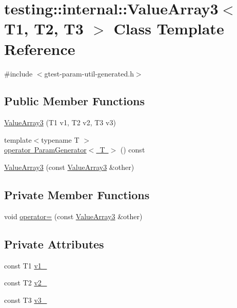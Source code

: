 \hypertarget{classtesting_1_1internal_1_1_value_array3}{}\section{testing\+::internal\+::Value\+Array3$<$ T1, T2, T3 $>$ Class Template Reference}
\label{classtesting_1_1internal_1_1_value_array3}


{\ttfamily \#include $<$gtest-\/param-\/util-\/generated.\+h$>$}

\subsection*{Public Member Functions}
\begin{DoxyCompactItemize}
\item 
\mbox{\hyperlink{classtesting_1_1internal_1_1_value_array3_aa83b0671fed7a231ba127600c904246d}{Value\+Array3}} (T1 v1, T2 v2, T3 v3)
\item 
{\footnotesize template$<$typename T $>$ }\\\mbox{\hyperlink{classtesting_1_1internal_1_1_value_array3_a4922d1cf7af801e82bdead15817b23fc}{operator Param\+Generator$<$ T $>$}} () const
\item 
\mbox{\hyperlink{classtesting_1_1internal_1_1_value_array3_a742d8b00de6b63b020740ebbc7bc8d31}{Value\+Array3}} (const \mbox{\hyperlink{classtesting_1_1internal_1_1_value_array3}{Value\+Array3}} \&other)
\end{DoxyCompactItemize}
\subsection*{Private Member Functions}
\begin{DoxyCompactItemize}
\item 
void \mbox{\hyperlink{classtesting_1_1internal_1_1_value_array3_a916b3dbd999ad49477e8482c4c72d00b}{operator=}} (const \mbox{\hyperlink{classtesting_1_1internal_1_1_value_array3}{Value\+Array3}} \&other)
\end{DoxyCompactItemize}
\subsection*{Private Attributes}
\begin{DoxyCompactItemize}
\item 
const T1 \mbox{\hyperlink{classtesting_1_1internal_1_1_value_array3_a72d173633c44c1482e7726c62ec6fe7b}{v1\+\_\+}}
\item 
const T2 \mbox{\hyperlink{classtesting_1_1internal_1_1_value_array3_abfbdc2c05ceb0773b3b8ab2165747beb}{v2\+\_\+}}
\item 
const T3 \mbox{\hyperlink{classtesting_1_1internal_1_1_value_array3_a408ef38b7ae8700dfe16170a62f68820}{v3\+\_\+}}
\end{DoxyCompactItemize}


